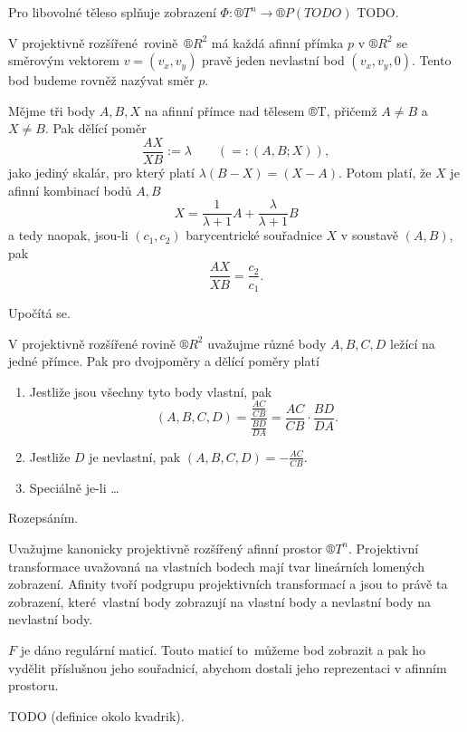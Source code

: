 \documentclass[12pt]{article}					%
\begin{document}
\begin{definice}
	Pro libovolné těleso splňuje zobrazení $\Phi: ®T^n \rightarrow ®P(TODO)$ TODO.
\end{definice}

\begin{veta}
	V projektivně rozšířené rovině $®R^2$ má každá afinní přímka $p$ v $®R^2$ se směrovým vektorem $v = (v_x, v_y)$ pravě jeden nevlastní bod $(v_x, v_y, 0)$. Tento bod budeme rovněž nazývat směr $p$.
\end{veta}


\begin{definice}
	Mějme tři body $A, B, X$ na afinní přímce nad tělesem ®T, přičemž $A ≠ B$ a $X ≠ B$. Pak dělící poměr
	$$ \frac{AX}{XB} := \lambda\qquad (=: (A, B; X)), $$
	jako jediný skalár, pro který platí $\lambda(B - X) = (X - A)$. Potom platí, že $X$ je afinní kombinací bodů $A, B$
	$$ X = \frac{1}{\lambda + 1}A + \frac{\lambda}{\lambda + 1}B $$
	a tedy naopak, jsou-li $(c_1, c_2)$ barycentrické souřadnice $X$ v soustavě $(A, B)$, pak
	$$ \frac{AX}{XB} = \frac{c_2}{c_1}. $$

	\begin{dukazin}
		Upočítá se.
	\end{dukazin}
\end{definice}

\begin{veta}
	V projektivně rozšířené rovině $®R^2$ uvažujme různé body $A, B, C, D$ ležící na jedné přímce. Pak pro dvojpoměry a dělící poměry platí

	\begin{enumerate}
		\item Jestliže jsou všechny tyto body vlastní, pak
			$$ (A, B, C, D) = \frac{\frac{AC}{CB}}{\frac{BD}{DA}} = \frac{AC}{CB}·\frac{BD}{DA}. $$
		\item Jestliže $D$ je nevlastní, pak $(A, B, C, D) = -\frac{AC}{CB}$.
		\item Speciálně je-li …
	\end{enumerate}

	\begin{dukazin}
		Rozepsáním.
	\end{dukazin}
\end{veta}

\begin{veta}
	Uvažujme kanonicky projektivně rozšířený afinní prostor $®T^n$. Projektivní transformace uvažovaná na vlastních bodech mají tvar lineárních lomených zobrazení. Afinity tvoří podgrupu projektivních transformací a jsou to právě ta zobrazení, které vlastní body zobrazují na vlastní body a nevlastní body na nevlastní body.

	\begin{dukazin}
		$F$ je dáno regulární maticí. Touto maticí to můžeme bod zobrazit a pak ho vydělit příslušnou jeho souřadnicí, abychom dostali jeho reprezentaci v afinním prostoru.
	\end{dukazin}
\end{veta}

TODO (definice okolo kvadrik).
\end{document}
